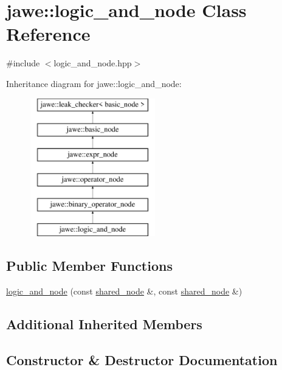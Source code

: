 \hypertarget{classjawe_1_1logic__and__node}{}\section{jawe\+:\+:logic\+\_\+and\+\_\+node Class Reference}
\label{classjawe_1_1logic__and__node}


{\ttfamily \#include $<$logic\+\_\+and\+\_\+node.\+hpp$>$}

Inheritance diagram for jawe\+:\+:logic\+\_\+and\+\_\+node\+:\begin{figure}[H]
\begin{center}
\leavevmode
\includegraphics[height=6.000000cm]{classjawe_1_1logic__and__node}
\end{center}
\end{figure}
\subsection*{Public Member Functions}
\begin{DoxyCompactItemize}
\item 
\hyperlink{classjawe_1_1logic__and__node_aa4aa31cf87a2b13a0f84b1b139dd706d}{logic\+\_\+and\+\_\+node} (const \hyperlink{namespacejawe_a3f307481d921b6cbb50cc8511fc2b544}{shared\+\_\+node} \&, const \hyperlink{namespacejawe_a3f307481d921b6cbb50cc8511fc2b544}{shared\+\_\+node} \&)
\end{DoxyCompactItemize}
\subsection*{Additional Inherited Members}


\subsection{Constructor \& Destructor Documentation}
\mbox{\label{classjawe_1_1logic__and__node_aa4aa31cf87a2b13a0f84b1b139dd706d}} 
